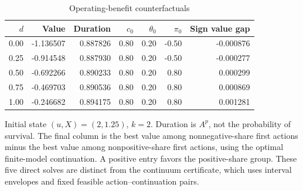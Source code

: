 \begin{table}[t]
\centering
\caption{Operating-benefit counterfactuals}
\label{tab:r5_contracts}
\small
\begin{tabular}{rrrrrrr}
\toprule
$d$ & Value & Duration & $c_0$ & $\theta_0$ & $\pi_0$ & Sign value gap \\
\midrule
0.00 & -1.136507 & 0.887826 & 0.80 & 0.20 & -0.50 & -0.000876 \\
0.25 & -0.914548 & 0.887930 & 0.80 & 0.20 & -0.50 & -0.000277 \\
0.50 & -0.692266 & 0.890233 & 0.80 & 0.20 & 0.80 & 0.000299 \\
0.75 & -0.469703 & 0.890536 & 0.80 & 0.20 & 0.80 & 0.000869 \\
1.00 & -0.246682 & 0.894175 & 0.80 & 0.20 & 0.80 & 0.001281 \\
\bottomrule
\end{tabular}
\par\medskip
\begin{minipage}{.97\linewidth}
\footnotesize Initial state $(u,X)=(2,1.25)$, $k=2$. Duration is $A^p$, not the probability of survival. The final column is the best value among nonnegative-share first actions minus the best value among nonpositive-share first actions, using the optimal finite-model continuation. A positive entry favors the positive-share group. These five direct solves are distinct from the continuum certificate, which uses interval envelopes and fixed feasible action--continuation pairs.
\end{minipage}
\end{table}
